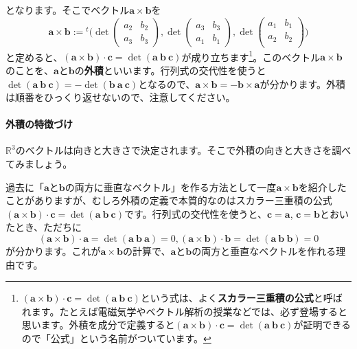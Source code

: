 となります。そこでベクトル$\bm{a} \times \bm{b}$を
\[
\bm{a} \times \bm{b}
:= 
{}^t\biggl(
\det
\begin{pmatrix}
a_2 & b_2 \\
a_3 & b_3
\end{pmatrix}, 
\det
\begin{pmatrix}
a_3 & b_3 \\
a_1 & b_1
\end{pmatrix}, 
\det
\begin{pmatrix}
a_1 & b_1 \\
a_2 & b_2 \\
\end{pmatrix}
\biggr)
\]
と定めると、$(\bm{a} \times \bm{b}) \cdot \bm{c} = \det(\bm{a} \ \bm{b} \ \bm{c})$が成り立ちます\footnote{$(\bm{a} \times \bm{b}) \cdot \bm{c} = \det(\bm{a} \ \bm{b} \ \bm{c})$という式は、よく\textbf{スカラー三重積の公式}と呼ばれます。たとえば電磁気学やベクトル解析の授業などでは、必ず登場すると思います。外積を成分で定義すると$(\bm{a} \times \bm{b}) \cdot \bm{c} = \det(\bm{a} \ \bm{b} \ \bm{c})$が証明できるので「公式」という名前がついています。}。このベクトル$\bm{a} \times \bm{b}$のことを、$\bm{a}$と$\bm{b}$の\textbf{外積}といいます。行列式の交代性を使うと$\det(\bm{a} \ \bm{b} \ \bm{c}) = - \det(\bm{b} \ \bm{a} \ \bm{c})$となるので、$\bm{a} \times \bm{b} = - \bm{b} \times \bm{a}$が分かります。外積は順番をひっくり返せないので、注意してください。

\paragraph{外積の特徴づけ}

$\mathbb{R}^3$のベクトルは向きと大きさで決定されます。そこで外積の向きと大きさを調べてみましょう。

過去に「$\bm{a}$と$\bm{b}$の両方に垂直なベクトル」を作る方法として一度$\bm{a} \times \bm{b}$を紹介したことがありますが、むしろ外積の定義で本質的なのはスカラー三重積の公式$(\bm{a} \times \bm{b}) \cdot \bm{c} = \det(\bm{a} \ \bm{b} \ \bm{c})$です。行列式の交代性を使うと、$\bm{c} = \bm{a}$, $\bm{c} = \bm{b}$とおいたとき、ただちに
\[
(\bm{a} \times \bm{b}) \cdot \bm{a} = \det(\bm{a} \ \bm{b} \ \bm{a}) = 0, 
(\bm{a} \times \bm{b}) \cdot \bm{b} = \det(\bm{a} \ \bm{b} \ \bm{b}) = 0
\]
が分かります。これが$\bm{a} \times \bm{b}$の計算で、$\bm{a}$と$\bm{b}$の両方と垂直なベクトルを作れる理由です。

